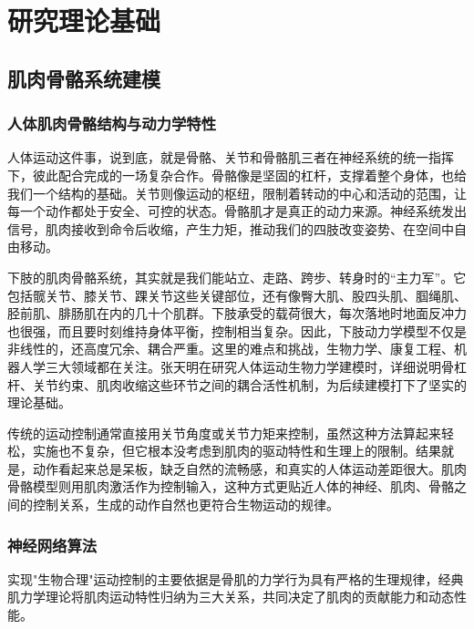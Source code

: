 
\chapter{研究理论基础}\label{ux7814ux7a76ux7406ux8bbaux57faux7840}

\section{肌肉骨骼系统建模}\label{ux808cux8089ux9aa8ux9abcux7cfbux7edfux5efaux6a21}

\subsection{人体肌肉骨骼结构与动力学特性}\label{ux4ebaux4f53ux808cux8089ux9aa8ux9abcux7ed3ux6784ux4e0eux52a8ux529bux5b66ux7279ux6027}

人体运动这件事，说到底，就是骨骼、关节和骨骼肌三者在神经系统的统一指挥下，彼此配合完成的一场复杂合作。骨骼像是坚固的杠杆，支撑着整个身体，也给我们一个结构的基础。关节则像运动的枢纽，限制着转动的中心和活动的范围，让每一个动作都处于安全、可控的状态。骨骼肌才是真正的动力来源。神经系统发出信号，肌肉接收到命令后收缩，产生力矩，推动我们的四肢改变姿势、在空间中自由移动。

下肢的肌肉骨骼系统，其实就是我们能站立、走路、跨步、转身时的“主力军”。它包括髋关节、膝关节、踝关节这些关键部位，还有像臀大肌、股四头肌、腘绳肌、胫前肌、腓肠肌在内的几十个肌群。下肢承受的载荷很大，每次落地时地面反冲力也很强，而且要时刻维持身体平衡，控制相当复杂。因此，下肢动力学模型不仅是非线性的，还高度冗余、耦合严重。这里的难点和挑战，生物力学、康复工程、机器人学三大领域都在关注。张天明在研究人体运动生物力学建模时，详细说明骨杠杆、关节约束、肌肉收缩这些环节之间的耦合活性机制，为后续建模打下了坚实的理论基础。

传统的运动控制通常直接用关节角度或关节力矩来控制，虽然这种方法算起来轻松，实施也不复杂，但它根本没考虑到肌肉的驱动特性和生理上的限制。结果就是，动作看起来总是呆板，缺乏自然的流畅感，和真实的人体运动差距很大。肌肉骨骼模型则用肌肉激活作为控制输入，这种方式更贴近人体的神经、肌肉、骨骼之间的控制关系，生成的动作自然也更符合生物运动的规律。

\subsection{神经网络算法}\label{ux795eux7ecfux7f51ux7edcux7b97ux6cd5}

实现"生物合理"运动控制的主要依据是骨肌的力学行为具有严格的生理规律，经典肌力学理论将肌肉运动特性归纳为三大关系，共同决定了肌肉的贡献能力和动态性能。

